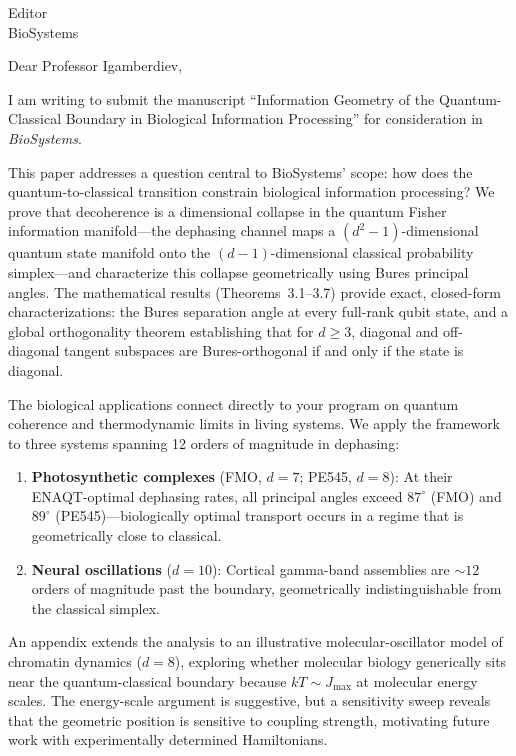 \documentclass[12pt,a4paper]{letter}
\begin{document}
\begin{letter}{Editor\\BioSystems}

\opening{Dear Professor Igamberdiev,}

I am writing to submit the manuscript ``Information Geometry of the Quantum-Classical Boundary in Biological Information Processing'' for consideration in \textit{BioSystems}.

This paper addresses a question central to BioSystems' scope: how does the quantum-to-classical transition constrain biological information processing? We prove that decoherence is a dimensional collapse in the quantum Fisher information manifold---the dephasing channel maps a $(d^2{-}1)$-dimensional quantum state manifold onto the $(d{-}1)$-dimensional classical probability simplex---and characterize this collapse geometrically using Bures principal angles. The mathematical results (Theorems~3.1--3.7) provide exact, closed-form characterizations: the Bures separation angle at every full-rank qubit state, and a global orthogonality theorem establishing that for $d \geq 3$, diagonal and off-diagonal tangent subspaces are Bures-orthogonal if and only if the state is diagonal.

The biological applications connect directly to your program on quantum coherence and thermodynamic limits in living systems. We apply the framework to three systems spanning 12 orders of magnitude in dephasing:

\begin{enumerate}
\item \textbf{Photosynthetic complexes} (FMO, $d = 7$; PE545, $d = 8$): At their ENAQT-optimal dephasing rates, all principal angles exceed $87^\circ$ (FMO) and $89^\circ$ (PE545)---biologically optimal transport occurs in a regime that is geometrically close to classical.

\item \textbf{Neural oscillations} ($d = 10$): Cortical gamma-band assemblies are ${\sim}12$ orders of magnitude past the boundary, geometrically indistinguishable from the classical simplex.
\end{enumerate}

An appendix extends the analysis to an illustrative molecular-oscillator model of chromatin dynamics ($d = 8$), exploring whether molecular biology generically sits near the quantum-classical boundary because $kT \sim J_{\max}$ at molecular energy scales. The energy-scale argument is suggestive, but a sensitivity sweep reveals that the geometric position is sensitive to coupling strength, motivating future work with experimentally determined Hamiltonians.


\end{letter}
\end{document}
